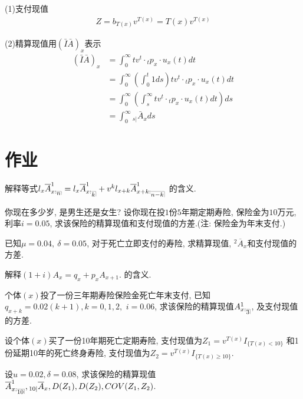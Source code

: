 \documentclass[a4paper,10pt]{ctexbook}
\makeatletter
\DeclareRobustCommand{\annu}[1]{_{%
    \def\arraystretch{0}%
    \setlength\arraycolsep{1pt}%
    \setlength\arrayrulewidth{.2pt}%
    \begin{array}[b]{@{}c|}\hline
        \\[\arraycolsep]%
        \scriptstyle #1%
    \end{array}%
}}
\makeatother
\begin{document}
(1)支付现值
\begin{align*}
    Z=b_{T(x)}v^{T(x)}=T(x)v^{T(x)}
\end{align*}

(2)精算现值用$\left( \bar{I}\bar{A} \right) _x$表示
\begin{align*}
    \left( \bar{I}\bar{A} \right) _x & =\int_0^{\infty}t v^t\cdot {}_tp_x\cdot u_x(t)dt                    \\
                                     & =\int_0^{\infty }(\int_0^t1ds)t v^t\cdot {}_tp_x\cdot u_x(t)dt      \\
                                     & =\int_0^{\infty}(\int_s^{\infty}t v^t\cdot {}_tp_x\cdot u_x(t)dt)ds \\
                                     & =\int_0^{\infty} {}_{s|}\bar{A}_x ds
\end{align*}
\section{作业}
\begin{exs}
    解释等式$l_x\overline{A}_{x:\annu{n}}^1=l_x\overline{A}_{x:\annu{k}}^1+v^kl_{x+k}\overline{A}_{x+k:\annu{n-k}}^1$ 的含义.
\end{exs}

\begin{exs}
    你现在多少岁, 是男生还是女生? 设你现在投$1$份$5$年期定期寿险, 保险金为$10$万元, 利率$i = 0.05$, 求该保险的精算现值和支付现值的方差.(注: 保险金为年末支付.)
\end{exs}

\begin{exs}
    已知$\mu = 0.04, ~\delta = 0.05$, 对于死亡立即支付的寿险, 求精算现值, ${}^2\overline{A}_x$和支付现值的方差.
\end{exs}

\begin{exs}
    解释$(1+i){A}_x = q_x + p_x {A}_{x+1}. $ 的含义.
\end{exs}

\begin{exs}
    个体$(x)$投了一份三年期寿险保险金死亡年末支付, 已知$q_{x+k}=0.02(k+1),k=0,1,2, $ $i=0.06$, 求该保险的精算现值${A}_{x:\annu{3}}^1$, 及支付现值的方差.
\end{exs}

\begin{exs}
    设个体$(x)$买了一份10年期死亡定期寿险, 支付现值为$Z_1=v^{T(x)}I_{\{T(x)<10\}}$ 和1份延期10年的死亡终身寿险, 支付现值为$Z_2=v^{T(x)}I_{\{T(x)\ge 10\}}$.

    设$u=0.02, \delta=0.08$, 求该保险的精算现值$\overline {A}_{x:\annu{10}}^1,  {}_{10|}\overline {A}_{x},  D(Z_1),   D(Z_2),   COV(Z_1,Z_2)$.
\end{exs}
\end{document}
